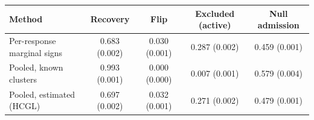 \begin{tabular}{lcccc}
\toprule
Method & Recovery & Flip & Excluded (active) & Null admission \\
\midrule
Per-response marginal signs & 0.683 (0.002) & 0.030 (0.001) & 0.287 (0.002) & 0.459 (0.001) \\
Pooled, known clusters & 0.993 (0.001) & 0.000 (0.000) & 0.007 (0.001) & 0.579 (0.004) \\
Pooled, estimated (HCGL) & 0.697 (0.002) & 0.032 (0.001) & 0.271 (0.002) & 0.479 (0.001) \\
\bottomrule
\end{tabular}